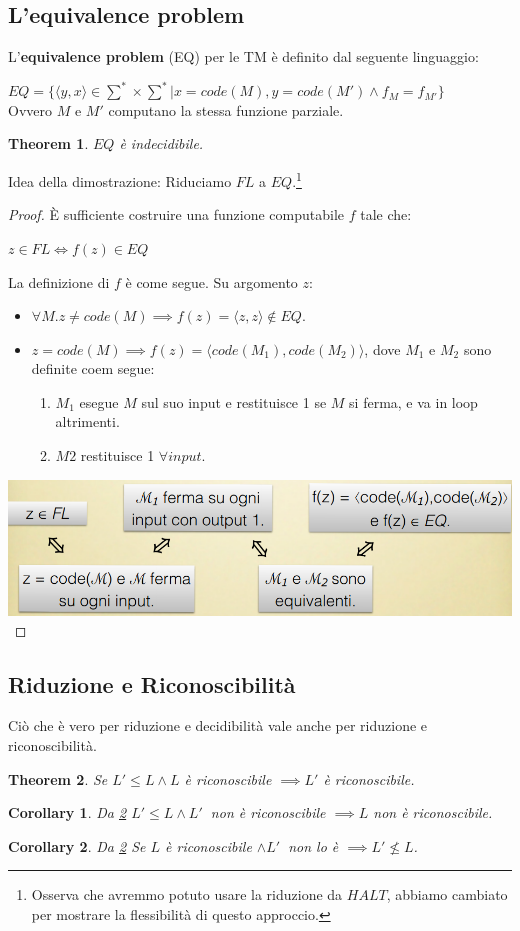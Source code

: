 \documentclass[a4paper, 12pt]{article}
\newtheorem{theorem}{Theorem}[section]
\newtheorem{corollary}{Corollary}[theorem]
\begin{document}
\subsection{L'equivalence problem}
L'\textbf{equivalence problem} (EQ) per le TM \`e definito dal seguente linguaggio:
\begin{center}
$EQ = \{\langle y,x \rangle \in \sum^{*}\times\sum^{*} | x=code(M),y=code(M') \land f_{M} = f_{M'}\}$\\
Ovvero $M$ e $M'$ computano la stessa funzione parziale.
\end{center}
\begin{theorem}
$EQ$ \`e indecidibile.
\end{theorem}
Idea della dimostrazione: Riduciamo $FL$ a $EQ$.\footnote{Osserva che avremmo potuto usare la riduzione da $HALT$, abbiamo cambiato per mostrare la flessibilit\`a di questo approccio.}
\begin{proof}
\`E sufficiente costruire una funzione computabile $f$ tale che:
\begin{center}
$z \in FL \iff f(z) \in EQ$
\end{center}
La definizione di $f$ \`e come segue. Su argomento $z$:
\begin{itemize}
\item $\forall M. z \neq code(M) \implies f(z) = \langle z,z\rangle \notin EQ$.
\item $z=code(M) \implies f(z) = \langle code(M_1), code(M_2) \rangle$, dove $M_1$ e $M_2$ sono definite coem segue:
\begin{enumerate}
\item $M_1$ esegue $M$ sul suo input e restituisce 1 se $M$ si ferma, e va in loop altrimenti.
\item $M2$ restituisce 1 $\forall input$.
\end{enumerate}
\end{itemize}
\includegraphics[scale=0.5]{EQ1.png}\\
\end{proof}
\subsection{Riduzione e Riconoscibilit\`a}
Ci\`o che \`e vero per riduzione e decidibilit\`a vale anche per riduzione e riconoscibilit\`a.
\begin{theorem}
\label{th:6}
Se $L' \leq L \land L$ \`e riconoscibile $\implies L'$ \`e riconoscibile.
\end{theorem}
\begin{corollary}
Da \ref{th:6} $L' \leq L \land L'\ $ non \`e riconoscibile $\implies L$ non \`e riconoscibile.
\end{corollary}
\begin{corollary}
Da \ref{th:6} Se $L$ \`e riconoscibile $\land L'\ $ non lo \`e $\implies L' \nleq L$. 
\end{corollary}
\end{document}

